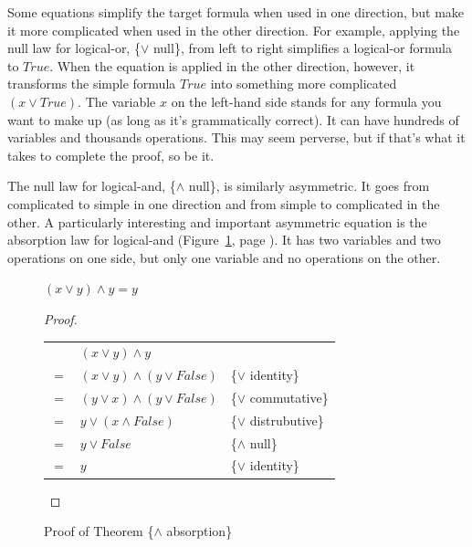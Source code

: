 Some equations simplify the target formula when used in one direction,
but make it more complicated when used in the other direction.
For example, applying
the null law for logical-or, \{$\vee$ null\}, from left to right simplifies a logical-or formula to $True$.
When the equation is applied in the other direction, however,
it transforms the simple formula $True$ into something more complicated $(x \vee True)$.
The variable $x$ on the left-hand side
stands for any formula you want to make up (as long as it's grammatically correct).
It can have hundreds of variables and thousands operations.
This may seem perverse, but if that's what it takes to complete the proof, so be it.

The null law for logical-and, \{$\wedge$ null\}, is similarly asymmetric.
It goes from complicated to simple in one direction
and from simple to complicated in the other.
A particularly interesting and important asymmetric equation
is the absorption law for logical-and
(Figure~\ref{and-absorption-thm}, page \pageref{and-absorption-thm}).
It has two variables and two operations on one side, but only one variable and no operations on the other.

\begin{figure}
\begin{theorem}
$(x \vee y) \wedge y = y$
\end{theorem}

\begin{proof}
\mbox{} \\
\begin{tabular}{llp{3.15in}}
    & $(x \vee y) \wedge y$                & \\
$=$ & $(x \vee y) \wedge (y \vee False)$   & \{$\vee$ identity\} \\
$=$ & $(y \vee x) \wedge (y \vee False)$   & \{$\vee$ commutative\} \\
$=$ & $y \vee (x \wedge False)$            & \{$\vee$ distrubutive\} \\
$=$ & $y \vee False$                       & \{$\wedge$ null\} \\
$=$ & $y$                                  & \{$\vee$ identity\} \\
\end{tabular}

\end{proof}
\caption{Proof of Theorem \{$\wedge$ absorption\}}
\label{and-absorption-thm}
\end{figure}

